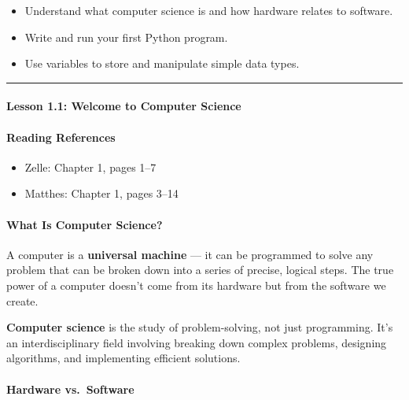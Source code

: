 \documentclass[
  justified,
  openright,
]{tufte-book}
\let\subsection\paragraph
\let\paragraph\paragraph
\let\subsection\paragraph
\let\paragraph\paragraph
\providecommand{\tightlist}{%
  \setlength{\itemsep}{0pt}\setlength{\parskip}{0pt}}
\begin{document}
\begin{itemize}
\tightlist
\item
  Understand what computer science is and how hardware relates to
  software.
\item
  Write and run your first Python program.
\item
  Use variables to store and manipulate simple data types.
\end{itemize}

\begin{center}\rule{0.5\linewidth}{0.5pt}\end{center}

\subsection{Lesson 1.1: Welcome to Computer
Science}\label{lesson-1.1-welcome-to-computer-science-1}

\subsection{Reading References}\label{reading-references-4}

\begin{itemize}
\tightlist
\item
  Zelle: Chapter 1, pages 1--7
\item
  Matthes: Chapter 1, pages 3--14
\end{itemize}

\subsection{What Is Computer
Science?}\label{what-is-computer-science}

A computer is a \textbf{universal machine} --- it can be programmed to
solve any problem that can be broken down into a series of precise,
logical steps. The true power of a computer doesn't come from its
hardware but from the software we create.

\textbf{Computer science} is the study of problem-solving, not just
programming. It's an interdisciplinary field involving breaking down
complex problems, designing algorithms, and implementing efficient
solutions.

\subsection{Hardware vs.~Software}\label{hardware-vs.-software}
\end{document}
